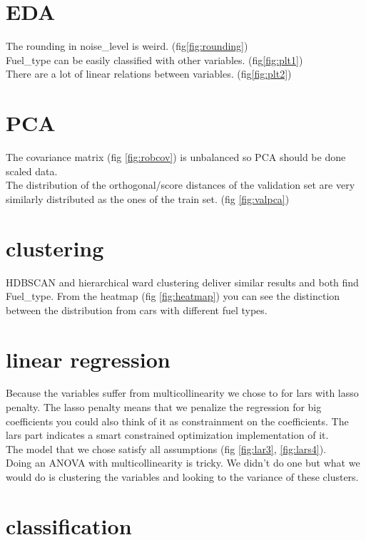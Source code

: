 \documentclass{article}
\begin{document}
\section{EDA}

The rounding in noise\_level is weird. (fig\ref*{fig:rounding})\\
Fuel\_type can be easily classified with other variables. (fig\ref*{fig:plt1})\\
There are a lot of linear relations between variables. (fig\ref*{fig:plt2})



\section{PCA}
The covariance matrix (fig \ref*{fig:robcov}) is unbalanced so PCA
should be done scaled data.\\
The distribution of the orthogonal/score distances of the validation set are very similarly
distributed as the ones of the train set. (fig \ref*{fig:valpca})


\section{clustering}
HDBSCAN and hierarchical ward clustering deliver similar results and both
find Fuel\_type. From the heatmap (fig \ref*{fig:heatmap}) you can see the distinction
between the distribution from cars with different fuel types.


\section{linear regression}
Because the variables suffer from multicollinearity we chose 
to for lars with lasso penalty. The lasso penalty means 
that we penalize the regression for big coefficients you could
also think of it as constrainment on the coefficients. The lars part
indicates a smart constrained optimization implementation of it.\\
The model that we chose satisfy all assumptions (fig \ref*{fig:lar3}, \ref*{fig:lars4}).\\
Doing an ANOVA with multicollinearity is tricky. We didn't do one but what we would do
is clustering the variables and looking to the variance of these clusters.

\section{classification}
\end{document}
